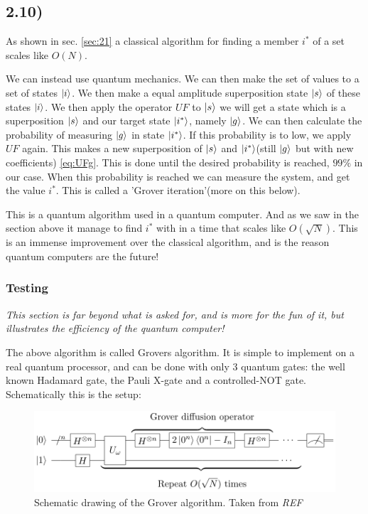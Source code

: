 \documentclass[a4paper,norsk, 10pt]{article}
\begin{document}
\subsection{2.10)}
As shown in sec. \ref{sec:21} a classical algorithm for finding a member $i^*$ of a set scales like $O(N)$.

We can instead use quantum mechanics. We can then make the set of values to a set of states $\ket{i}$. We then make a equal amplitude superposition state $\ket{s}$ of these states $\ket{i}$. We then apply the operator $UF$ to $\ket{s}$ we will get a state which is a superposition $\ket{s}$ and our target state $\ket{i^*}$, namely $\ket{g}$. We can then calculate the probability of measuring $\ket{g}$ in state $\ket{i^*}$. If this probability is to low, we apply $UF$ again. This makes a new superposition of $\ket{s}$ and $\ket{i^*}$(still $\ket{g}$ but with new coefficients) \ref{eq:UFg}. This is done until the desired probability is reached, $99\%$ in our case. When this probability is reached we can measure the system, and get the value $i^*$. This is called a 'Grover iteration'(more on this below).

This is a quantum algorithm used in a quantum computer. And as we saw in the section above it manage to find $i^*$ with in a time that scales like $O(\sqrt{N})$. This is an immense improvement over the classical algorithm, and is the reason quantum computers are the future!

\subsubsection{Testing}
\textit{This section is far beyond what is asked for, and is more for the fun of it, but illustrates the efficiency of the quantum computer!}

The above algorithm is called Grovers algorithm. It is simple to implement on a real quantum processor, and can be done with only 3 quantum gates: the well known Hadamard gate, the Pauli X-gate and a controlled-NOT gate. Schematically this is the setup:

\begin{figure}[H]
\centering
\includegraphics[scale=0.5]{grover.png}
\caption{Schematic drawing of the Grover algorithm. Taken from \emph{REF}}
\end{figure}
\end{document}
